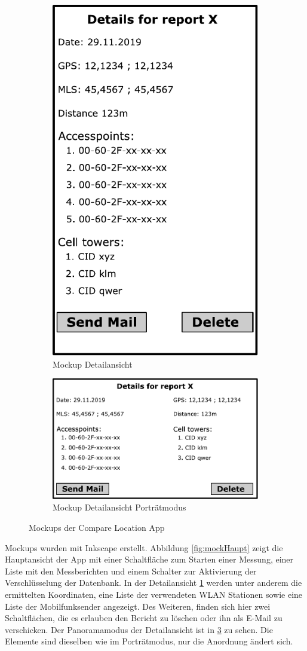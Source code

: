 \begin{figure}[H]
\begin{subfigure}{.4\textwidth}
		\includegraphics[width=.7\textwidth]{graphics/mockupdetailfragment}
		\caption{Mockup Detailansicht}
		\label{fig:mockDetail}
	\end{subfigure}
	\begin{subfigure}{\textwidth}
		\centering
		\includegraphics[width=.7\textwidth]{graphics/mockupdetailfragmentlandscape}
		\caption{Mockup Detailansicht Porträtmodus}
		\label{fig:mockDetailLand}
	\end{subfigure}
	\caption{Mockups der Compare Location App}
\end{figure}


Mockups wurden mit Inkscape erstellt. Abbildung \ref{fig:mockHaupt} zeigt die Hauptansicht der App mit einer Schaltfläche zum Starten einer Messung, einer Liste mit den Messberichten und einem Schalter zur Aktivierung der Verschlüsselung der Datenbank. In der Detailansicht \ref{fig:mockDetail} werden unter anderem die ermittelten Koordinaten, eine Liste der verwendeten WLAN Stationen sowie eine Liste der Mobilfunksender angezeigt. Des Weiteren, finden sich hier zwei Schaltflächen, die es erlauben den Bericht zu löschen oder ihn als E-Mail zu verschicken. Der Panoramamodus der Detailansicht ist in \ref{fig:mockDetailLand} zu sehen. Die Elemente sind dieselben wie im Porträtmodus, nur die Anordnung ändert sich.